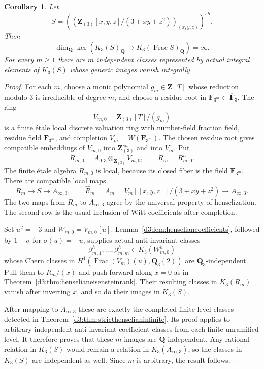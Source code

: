 \documentclass[11pt,a4paper]{amsart}
\numberwithin{equation}{section}
\newtheorem{corollary}[theorem]{Corollary}
\theoremstyle{definition}
\theoremstyle{remark}
\newcommand{\Q}{\mathbf Q}
\newcommand{\Z}{\mathbf Z}
\newcommand{\F}{\mathbf F}
\newcommand{\Frac}{\operatorname{Frac}}
\begin{document}
\begin{corollary}
\label{d3:cor:stricthenselizationinfinite}
Let
\[
 S=\left(\left(\Z_{(3)}[x,y,z]/(3+xy+z^2)\right)_{(x,y,z)}\right)^{sh}.
\]
Then
\[
 \dim_{\Q}\ker\left(K_3(S)_{\Q}
      \longrightarrow K_3(\Frac S)_{\Q}\right)=\infty.
\]
For every $m\geq1$ there are $m$ independent classes represented by
actual integral elements of $K_3(S)$ whose generic images vanish
integrally.
\end{corollary}
\begin{proof}
For each $m$, choose a monic polynomial $g_m\in\Z[T]$ whose reduction
modulo $3$ is irreducible of degree $m$, and choose a residue root in
$\F_{3^m}\subset\overline{\F}_3$.
The ring
\[
 V_{m,0}=\Z_{(3)}[T]/(g_m)
\]
is a finite \'etale local discrete valuation ring with number-field
fraction field, residue field $\F_{3^m}$, and completion
$V_m=W(\F_{3^m})$.  The chosen residue root gives compatible embeddings
of $V_{m,0}$ into $\Z_{(3)}^{sh}$ and into $V_m$.
Put
\[
 R_{m,0}=A_{0,3}\otimes_{\Z_{(3)}}V_{m,0},\qquad R_m=R_{m,0}^h.
\]
The finite \'etale algebra $R_{m,0}$ is local, because its closed fiber
is the field $\F_{3^m}$.  There are compatible local maps
\[
 R_m\longrightarrow S\longrightarrow A_{\infty,3},
 \qquad
 \widehat R_m=A_m=V_m[[x,y,z]]/(3+xy+z^2)
       \longrightarrow A_{\infty,3}.
\]
The two maps from $R_m$ to $A_{\infty,3}$ agree by the universal
property of henselization.  The second row is the usual inclusion of
Witt coefficients after completion.

Set $u^2=-3$ and $W_{m,0}=V_{m,0}[u]$.
Lemma~\ref{d3:lem:henseliancoefficients}, followed by $1-\sigma$ for
$\sigma(u)=-u$, supplies actual anti-invariant classes
\[
 \beta_{m,1}^h,\ldots,\beta_{m,m}^h\in K_3(W_{m,0}^h)
\]
whose Chern classes in $H^1(\Frac(V_m)(u),\Q_3(2))$ are
$\Q_3$-independent.
Pull them to $R_m/(x)$ and push forward along $x=0$ as in
Theorem~\ref{d3:thm:henselianeisensteinrank}.  Their resulting classes in
$K_3(R_m)$ vanish after inverting $x$, and so do their images in
$K_3(S)$.

After mapping to $A_{\infty,3}$ these are exactly the completed
finite-level classes detected in
Theorem~\ref{d3:thm:stricthenselianinfinite}.  Its proof applies to
arbitrary independent anti-invariant coefficient classes from each
finite unramified level.  It therefore proves that these $m$ images
are $\Q$-independent.  Any rational relation in $K_3(S)$ would remain
a relation in $K_3(A_{\infty,3})$, so the classes in $K_3(S)$ are
independent as well.  Since $m$ is arbitrary, the result follows.
\end{proof}
\end{document}
